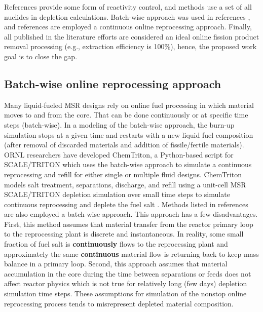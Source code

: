 References \cite{li_optimization_2018,de_troullioud_de_lanversin_toward_2017,doligez_coupled_2014,
heuer_towards_2014, sheu_depletion_2013, aufiero_extended_2013} provide some form of reactivity control, 
and methods \cite{doligez_coupled_2014,heuer_towards_2014,aufiero_extended_2013,ahmad_neutronics_2015, 
park_whole_2015,jeong_equilibrium_2016,rykhlevskii_modeling_2019,nuttin_potential_2005} use a set of all nuclides in depletion calculations. Batch-wise approach was used in 
references \cite{powers_new_2013,powers_inventory_2014,betzler_molten_2017, 
li_optimization_2018, park_whole_2015, jeong_equilibrium_2016,
rykhlevskii_advanced_2018, rykhlevskii_modeling_2019},
and references \cite{nuttin_potential_2005,doligez_coupled_2014,
heuer_towards_2014, fiorina_preliminary_2012-1, sheu_depletion_2013,
aufiero_extended_2013, zhou_fuel_2018-1, ahmad_neutronics_2015,
de_troullioud_de_lanversin_toward_2017} are employed a continuous online 
reprocessing approach. Finally, all published in the literature efforts 
are considered an ideal online fission product removal processing  (e.g., 
extraction efficiency is 100\%), hence, the proposed work goal is 
to close the gap.


\subsection{Batch-wise online reprocessing approach}
Many liquid-fueled \gls{MSR} designs rely on online fuel processing in which  
material moves to and from the core. That can be done continuously or at 
specific time steps (batch-wise). In a modeling of the batch-wise approach, 
the burn-up simulation stops at a given 
time and restarts with a new liquid fuel composition (after removal of discarded 
materials and addition of fissile/fertile materials). \gls{ORNL} researchers 
have developed ChemTriton, a Python-based script for SCALE/TRITON which uses the 
batch-wise approach to simulate a continuous reprocessing and refill for 
either single or multiple fluid designs. ChemTriton models salt 
treatment, separations, discharge, and refill using a unit-cell \gls{MSR} 
SCALE/TRITON depletion simulation over small time steps to simulate continuous 
reprocessing and deplete the fuel salt \cite{powers_new_2013}. Methods listed in 
references \cite{zhou_fuel_2018-1, sheu_depletion_2013,
park_whole_2015, jeong_equilibrium_2016, powers_inventory_2014,
betzler_molten_2017,rykhlevskii_modeling_2019} 
are also employed a batch-wise approach. This approach has a few disadvantages. 
First, this method assumes that material transfer from the reactor primary 
loop to the reprocessing plant is discrete and instantaneous. In reality, 
some small fraction of fuel salt is \textbf{continuously} flows to the 
reprocessing plant and approximately the same \textbf{continuous} material flow 
is returning back to keep mass balance in a primary loop. Second, this approach 
assumes that material accumulation in the core 
during the time between separations or feeds does not affect reactor physics which 
is not true for relatively long (few days) depletion simulation time steps. 
These assumptions for simulation of the nonstop online reprocessing process 
tends to misrepresent depleted material composition.


